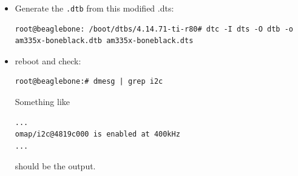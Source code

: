 \documentclass[
	fontsize=10pt
	paper=a4
]{scrartcl}
\begin{document}
\begin{itemize}
\item Generate the \texttt{.dtb} from this modified .dts:
\begin{lstlisting}
root@beaglebone: /boot/dtbs/4.14.71-ti-r80# dtc -I dts -O dtb -o am335x-boneblack.dtb am335x-boneblack.dts
\end{lstlisting}

\item reboot and check:
\begin{lstlisting}
root@beaglebone:# dmesg | grep i2c
\end{lstlisting}
Something like
\begin{lstlisting}
... 
omap/i2c@4819c000 is enabled at 400kHz
...
\end{lstlisting}
should be the output.


\end{itemize}
\end{document}
